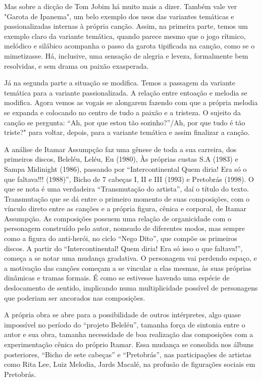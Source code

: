 Mas sobre a dicção de Tom Jobim há muito mais a dizer. Também vale ver
"Garota de Ipanema", um belo exemplo dos usos das variantes temáticas e
passionalizadas internas à própria canção. Assim, na primeira parte,
temos um exemplo claro da variante temática, quando parece mesmo que o
jogo rítmico, melódico e silábico acompanha o passo da garota tipificada
na canção, como se o mimetizasse. Há, inclusive, uma sensação de alegria
e leveza, formalmente bem resolvidas, e sem drama ou paixão exasperada.

Já na segunda parte a situação se modifica. Temos a passagem da variante
temática para a variante passionalizada. A relação entre entoação e
melodia se modifica. Agora vemos as vogais se alongarem fazendo com que
a própria melodia se expanda e colocando no centro de tudo a paixão e a
tristeza. O sujeito da canção se pergunta: ``Ah, por que estou tão
sozinho?''/Ah, por que tudo é tão triste?" para voltar, depois, para a
variante temática e assim finalizar a canção.

A análise de Itamar Assumpção faz uma gênese de toda a sua carreira, dos
primeiros discos, Beleléu, Leléu, Eu (1980), Às próprias custas S.A
(1983) e Sampa Midinight (1986), passando por ``Intercontinental Quem
diria! Era só o que faltava!!! (1988)'', Bicho de 7 cabeças I, II e III
(1993) e Pretobrás (1998). O que se nota é uma verdadeira ``Transmutação
do artista'', daí o título do texto. Transmutação que se dá entre o
primeiro momento de suas composições, com o vínculo direto entre as
canções e a própria figura, cênica e corporal, de Itamar Assumpção. As
composições possuem uma relação de organicidade com o personagem
construído pelo autor, nomeado de diferentes modos, mas sempre como a
figura do anti-herói, no ciclo ``Nego Dito'', que compõe os primeiros
discos. A partir do ``Intercontinental! Quem diria! Era só isso o que
faltava!'', começa a se notar uma mudança gradativa. O personagem vai
perdendo espaço, e a motivação das canções começam a se vincular a elas
mesmas, às suas próprias dinâmicas e tramas formais. É como se estivesse
havendo uma espécie de deslocamento de sentido, implicando numa
multiplicidade possível de personagens que poderiam ser ancorados nas
composições.

A própria obra se abre para a possibilidade de outros intérpretes, algo
quase impossível no período do ``projeto Beleléu'', tamanha força de
sintonia entre o autor e sua obra, tamanha necessidade de boa realização
das composições com a experimentação cênica do próprio Itamar. Essa
mudança se consolida nos álbuns posteriores, ``Bicho de sete cabeças'' e
``Pretobrás'', nas participações de artistas como Rita Lee, Luiz
Melodia, Jards Macalé, na profusão de figurações sociais em Pretobrás.


